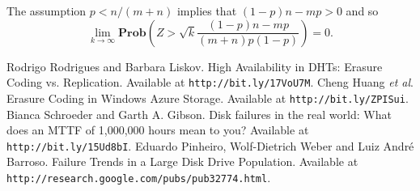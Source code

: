 \documentclass[11pt]{article}
\begin{document}
The assumption $p < n/(m+n)$ implies that $(1-p)n - mp > 0$ and so 
\[ \lim_{k\to\infty} \mathbf{Prob}\left(Z > \sqrt{k} \frac{(1-p)n - mp}{(m+n)p(1-p)}\right) = 0.\]

\begin{thebibliography}{9}
 Rodrigo Rodrigues and Barbara Liskov. High Availability in DHTs: Erasure Coding vs. Replication. Available at \texttt{http://bit.ly/17VoU7M}.
 Cheng Huang \emph{et al}. Erasure Coding in Windows Azure Storage. Available at \texttt{http://bit.ly/ZPISui}.
 Bianca Schroeder and Garth A. Gibson. Disk failures in the real world: What does an MTTF of 1,000,000 hours mean to you? Available at \texttt{http://bit.ly/15Ud8bI}.
 Eduardo Pinheiro, Wolf-Dietrich Weber and Luiz Andr\'{e} Barroso. Failure Trends in a Large Disk Drive Population. Available at \texttt{http://research.google.com/pubs/pub32774.html}.

\end{thebibliography}
\end{document}
